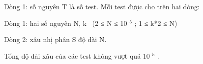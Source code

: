 Dòng 1: số nguyên T là số test. Mỗi test được cho trên hai dòng:  

   Dòng 1: hai số nguyên N, k  (2 ≤ N ≤ 10   $^    5   $   ; 1 ≤ k*2 ≤ N)  

   Dòng 2: xâu nhị phân S độ dài N.  

   Tổng độ dài xâu của các test không vượt quá 10   $^    5   $   .